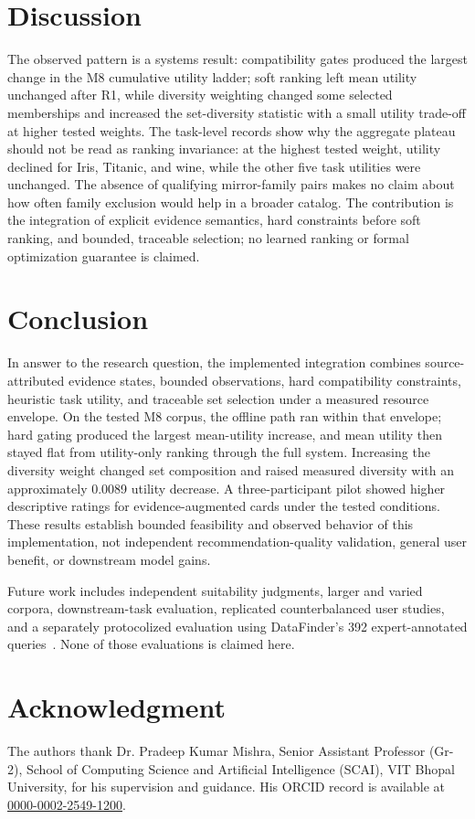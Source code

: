 \documentclass[conference]{IEEEtran}
\begin{document}
\section{Discussion}
The observed pattern is a systems result: compatibility gates produced the largest change in the M8 cumulative utility ladder; soft ranking left mean utility unchanged after R1, while diversity weighting changed some selected memberships and increased the set-diversity statistic with a small utility trade-off at higher tested weights. The task-level records show why the aggregate plateau should not be read as ranking invariance: at the highest tested weight, utility declined for Iris, Titanic, and wine, while the other five task utilities were unchanged. The absence of qualifying mirror-family pairs makes no claim about how often family exclusion would help in a broader catalog. The contribution is the integration of explicit evidence semantics, hard constraints before soft ranking, and bounded, traceable selection; no learned ranking or formal optimization guarantee is claimed.

\section{Conclusion}
In answer to the research question, the implemented integration combines source-attributed evidence states, bounded observations, hard compatibility constraints, heuristic task utility, and traceable set selection under a measured resource envelope. On the tested M8 corpus, the offline path ran within that envelope; hard gating produced the largest mean-utility increase, and mean utility then stayed flat from utility-only ranking through the full system. Increasing the diversity weight changed set composition and raised measured diversity with an approximately 0.0089 utility decrease. A three-participant pilot showed higher descriptive ratings for evidence-augmented cards under the tested conditions. These results establish bounded feasibility and observed behavior of this implementation, not independent recommendation-quality validation, general user benefit, or downstream model gains.

Future work includes independent suitability judgments, larger and varied corpora, downstream-task evaluation, replicated counterbalanced user studies, and a separately protocolized evaluation using DataFinder's 392 expert-annotated queries~\cite{viswanathan2023datafinder}. None of those evaluations is claimed here.

\section*{Acknowledgment}
The authors thank Dr. Pradeep Kumar Mishra, Senior Assistant Professor (Gr-2), School of Computing Science and Artificial Intelligence (SCAI), VIT Bhopal University, for his supervision and guidance. His ORCID record is available at \href{https://orcid.org/0000-0002-2549-1200}{0000-0002-2549-1200}.



\end{document}
